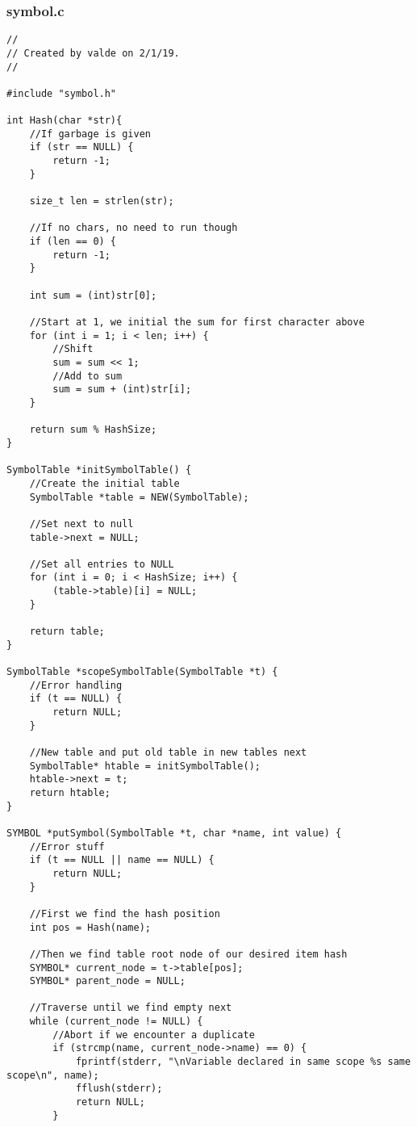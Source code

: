\documentclass[a4paper]{article}
\begin{document}
\subsubsection{symbol.c}
\begin{verbatim}
//
// Created by valde on 2/1/19.
//

#include "symbol.h"

int Hash(char *str){
    //If garbage is given
    if (str == NULL) {
        return -1;
    }

    size_t len = strlen(str);

    //If no chars, no need to run though
    if (len == 0) {
        return -1;
    }

    int sum = (int)str[0];

    //Start at 1, we initial the sum for first character above
    for (int i = 1; i < len; i++) {
        //Shift
        sum = sum << 1;
        //Add to sum
        sum = sum + (int)str[i];
    }

    return sum % HashSize;
}

SymbolTable *initSymbolTable() {
    //Create the initial table
    SymbolTable *table = NEW(SymbolTable);

    //Set next to null
    table->next = NULL;

    //Set all entries to NULL
    for (int i = 0; i < HashSize; i++) {
        (table->table)[i] = NULL;
    }

    return table;
}

SymbolTable *scopeSymbolTable(SymbolTable *t) {
    //Error handling
    if (t == NULL) {
        return NULL;
    }

    //New table and put old table in new tables next
    SymbolTable* htable = initSymbolTable();
    htable->next = t;
    return htable;
}

SYMBOL *putSymbol(SymbolTable *t, char *name, int value) {
    //Error stuff
    if (t == NULL || name == NULL) {
        return NULL;
    }

    //First we find the hash position
    int pos = Hash(name);

    //Then we find table root node of our desired item hash
    SYMBOL* current_node = t->table[pos];
    SYMBOL* parent_node = NULL;

    //Traverse until we find empty next
    while (current_node != NULL) {
        //Abort if we encounter a duplicate
        if (strcmp(name, current_node->name) == 0) {
            fprintf(stderr, "\nVariable declared in same scope %s same scope\n", name);
            fflush(stderr);
            return NULL;
        }
        

\end{verbatim}
\end{document}
